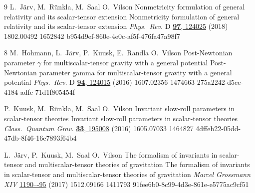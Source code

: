 
\lisaArtikkel%
	{9}%
	{L.\ J\"arv, M.\ R\"unkla, M.\ Saal \ja{} O.\ Vilson}%
	{Nonmetricity formulation of general relativity and its scalar-tensor extension}%
	{Nonmetricity formulation of general relativity and its scalar-tensor extension}%
	{\textit{Phys.\ Rev.} D \href{https://dx.doi.org/10.1103/PhysRevD.97.124025}{\textbf{97}, 124025} (2018)}%
	{1802.00492}%
	{1652842}%
	{b954d9ef-860e-4e0c-af5f-476fa47a98f7} %


\lisaArtikkel%
	{8}%
	{M.\ Hohmann, L.\ J\"arv, P.\ Kuusk, E.\ Randla \ja{} O.\ Vilson}%
	{Post-Newtonian parameter $\gamma$ for multiscalar-tensor gravity with a general potential}%
	{Post-Newtonian parameter gamma for multiscalar-tensor gravity with a general potential}%
	{\textit{Phys.\ Rev.} D \href{https://doi.org/10.1103/PhysRevD.94.124015}{{\bf 94}, 124015} (2016)}%
	{1607.02356}%
	{1474663}%
	{275a2242-d5ce-4184-adfc-71d1f805454f} %


	{P.\ Kuusk, M.\ R\"unkla, M.\ Saal \ja{} O.\ Vilson}%
	{Invariant slow-roll parameters in scalar-tensor theories}%
	{Invariant slow-roll parameters in scalar-tensor theories}%
	{\textit{Class.\ Quantum Grav.} \href{https://doi.org/10.1088/0264-9381/33/19/195008}{{\bf 33}, 195008} (2016)}%
	{1605.07033}%
	{1464827}%
	{4dffeb22-05dd-47db-8f46-16e7893f64b4} %


	{L.\ J\"arv, P.\ Kuusk, M.\ Saal \ja{} O.\ Vilson}%
	{The formalism of invariants in scalar-tensor and multiscalar-tensor theories of gravitation}%
	{The formalism of invariants in scalar-tensor and multiscalar-tensor theories of gravitation}%
	{\textit{Marcel Grossmann XIV} \href{https://dx.doi.org/10.1142/9789813226609_0083}{1190–-95} (2017)}%
	{1512.09166}%
	{1411793}%
	{91fee6b0-8c99-4d3e-861e-e5775ac9cf51} %


